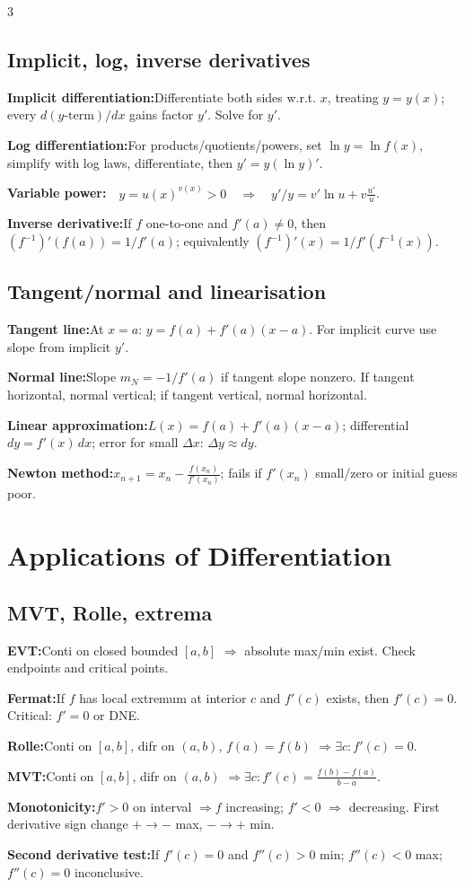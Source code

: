 \documentclass[10pt]{article}
\newenvironment{cheatitems}{\par\vspace{-2pt}}{\par\vspace{-2pt}}
\newcommand{\cheatrow}[2]{%
  \par\noindent\textbf{#1:}\nobreak\hspace{0.25em}#2\par
}
\begin{document}
\begin{multicols}{3}
\subsection*{Implicit, log, inverse derivatives}
\begin{cheatitems}
\cheatrow{Implicit differentiation}{Differentiate both sides w.r.t. $x$, treating $y=y(x)$; every $d(y\text{-term})/dx$ gains factor $y'$. Solve for $y'$.}
\cheatrow{Log differentiation}{For products/quotients/powers, set $\ln y=\ln f(x)$, simplify with log laws, differentiate, then $y'=y(\ln y)'$.}
\vspace{-5pt}
\cheatrow{Variable power}{$\displaystyle \quad y=u(x)^{v(x)}>0 \quad \Rightarrow \quad y'/y=v'\ln u+v\frac{u'}u$.}
\vspace{-2pt}
\cheatrow{Inverse derivative}{If $f$ one-to-one and $f'(a)\ne0$, then $(f^{-1})'(f(a))=1/f'(a)$; equivalently $(f^{-1})'(x)=1/f'(f^{-1}(x))$.}
\end{cheatitems}

\subsection*{Tangent/normal and linearisation}
\begin{cheatitems}
\cheatrow{Tangent line}{At $x=a$: $y=f(a)+f'(a)(x-a)$. For implicit curve use slope from implicit $y'$.}
\cheatrow{Normal line}{Slope $m_N=-1/f'(a)$ if tangent slope nonzero. If tangent horizontal, normal vertical; if tangent vertical, normal horizontal.}
\cheatrow{Linear approximation}{$L(x)=f(a)+f'(a)(x-a)$; differential $dy=f'(x)\,dx$; error for small $\Delta x$: $\Delta y\approx dy$.}
\cheatrow{Newton method}{$x_{n+1}=x_n-\frac{f(x_n)}{f'(x_n)}$; fails if $f'(x_n)$ small/zero or initial guess poor.}
\end{cheatitems}

\section*{Applications of Differentiation}

\subsection*{MVT, Rolle, extrema}
\begin{cheatitems}
\vspace{2pt}
\cheatrow{EVT}{Conti on closed bounded $[a,b]$ $\Rightarrow$ absolute max/min exist. Check endpoints and critical points.}
\cheatrow{Fermat}{If $f$ has local extremum at interior $c$ and $f'(c)$ exists, then $f'(c)=0$. Critical: $f'=0$ or DNE.}
\cheatrow{Rolle}{Conti on $[a,b]$, difr on $(a,b)$, $f(a)=f(b)$ $\Rightarrow \exists c:f'(c)=0$.}
\cheatrow{MVT}{Conti on $[a,b]$, difr on $(a,b)$ $\Rightarrow \exists c:f'(c)=\frac{f(b)-f(a)}{b-a}$.}
\cheatrow{Monotonicity}{$f'>0$ on interval $\Rightarrow f$ increasing; $f'<0$ $\Rightarrow$ decreasing. First derivative sign change $+\to-$ max, $-\to+$ min.}
\cheatrow{Second derivative test}{If $f'(c)=0$ and $f''(c)>0$ min; $f''(c)<0$ max; $f''(c)=0$ inconclusive.}
\end{cheatitems}


\end{multicols}
\end{document}
